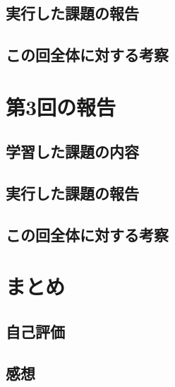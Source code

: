 \documentclass[10pt,a4paper]{ltjsarticle}
\begin{document}
\subsection{実行した課題の報告}

\subsection{この回全体に対する考察}

\section{第3回の報告}
\subsection{学習した課題の内容}

\subsection{実行した課題の報告}

\subsection{この回全体に対する考察}


\section{まとめ}
\subsection{自己評価}

\subsection{感想}


\end{document}
